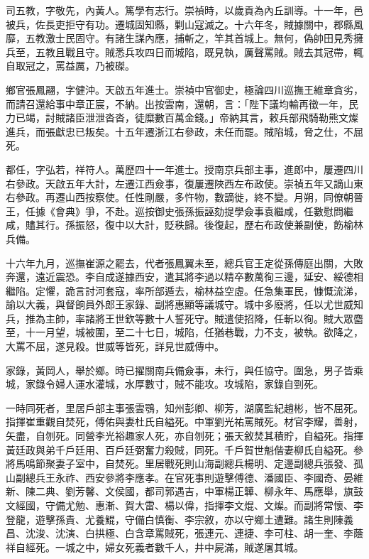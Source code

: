 \begin{pinyinscope}
司五教，字敬先，內黃人。篤學有志行。崇禎時，以歲貢為內丘訓導。十一年，邑被兵，佐長吏拒守有功。遷城固知縣，剿山寇滅之。十六年冬，賊據關中，郡縣風靡，五教激士民固守。有諸生謀內應，捕斬之，竿其首城上。無何，偽帥田見秀擁兵至，五教且戰且守。賊悉兵攻四日而城陷，既見執，厲聲罵賊。賊去其冠帶，輒自取冠之，罵益厲，乃被磔。

鄉官張鳳翮，字健沖。天啟五年進士。崇禎中官御史，極論四川巡撫王維章貪劣，而請召還給事中章正宸，不納。出按雲南，還朝，言：「陛下議均輸再徵一年，民力已竭，討賊諸臣泄泄沓沓，徒糜數百萬金錢。」帝納其言，敕兵部飛騎勒熊文燦進兵，而張獻忠已叛矣。十五年遷浙江右參政，未任而罷。賊陷城，脅之仕，不屈死。

都任，字弘若，祥符人。萬歷四十一年進士。授南京兵部主事，進郎中，屢遷四川右參政。天啟五年大計，左遷江西僉事，復屢遷陜西左布政使。崇禎五年又謫山東右參政。再遷山西按察使。任性剛嚴，多忤物，數謫徙，終不變。月朔，同僚朝晉王，任據《會典》爭，不赴。巡按御史張孫振誣劾提學僉事袁繼咸，任數慰問繼咸，贐其行。孫振怒，復中以大計，貶秩歸。後復起，歷右布政使兼副使，飭榆林兵備。

十六年九月，巡撫崔源之罷去，代者張鳳翼未至，總兵官王定從孫傳庭出關，大敗奔還，遠近震恐。李自成遂據西安，遣其將李過以精卒數萬徇三邊，延安、綏德相繼陷。定懼，詭言討河套寇，率所部遁去，榆林益空虛。任急集軍民，慷慨流涕，諭以大義，與督餉員外郎王家錄、副將惠顯等議城守。城中多廢將，任以尤世威知兵，推為主帥，率諸將王世欽等數十人誓死守。賊遣使招降，任斬以徇。賊大眾麕至，十一月望，城被圍，至二十七日，城陷，任猶巷戰，力不支，被執。欲降之，大罵不屈，遂見殺。世威等皆死，詳見世威傳中。

家錄，黃岡人，舉於鄉。時已擢關南兵備僉事，未行，與任協守。圍急，男子皆乘城，家錄令婦人運水灌城，水厚數寸，賊不能攻。攻城陷，家錄自剄死。

一時同死者，里居戶部主事張雲鶚，知州彭卿、柳芳，湖廣監紀趙彬，皆不屈死。指揮崔重觀自焚死，傅佑與妻杜氏自縊死。中軍劉光祐罵賊死。材官李耀，善射，矢盡，自刎死。同營李光裕趣家人死，亦自刎死；張天敘焚其積貯，自縊死。指揮黃廷政與弟千戶廷用、百戶廷弼奮力殺賊，同死。千戶賀世魁偕妻柳氏自縊死。參將馬鳴節聚妻子室中，自焚死。里居戰死則山海副總兵楊明、定邊副總兵張發、孤山副總兵王永祚、西安參將李應孝。在官死事則遊擊傅德、潘國臣、李國奇、晏維新、陳二典、劉芳馨、文侯國，都司郭遇吉，中軍楊正韡、柳永年、馬應舉，旗鼓文經國，守備尤勉、惠漸、賀大雷、楊以偉，指揮李文焜、文燦。而副將常懷、李登龍，遊擊孫貴、尤養鯤，守備白慎衡、李宗敘，亦以守鄉土遭難。諸生則陳義昌、沈浚、沈演、白拱極、白含章罵賊死，張連元、連捷、李可柱、胡一奎、李蔭祥自經死。一城之中，婦女死義者數千人，井中屍滿，賊遂屠其城。


\end{pinyinscope}
